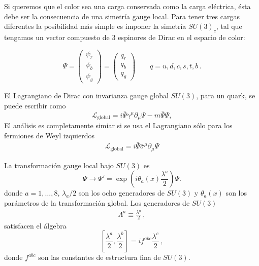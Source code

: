 \begin{frame}
Si queremos que el color sea una carga conservada como la carga eléctrica, ésta debe ser la consecuencia de una simetría gauge local. Para tener tres cargas diferentes la posibilidad más simple es imponer la simetría $SU(3)_c$, tal que tengamos un vector compuesto de 3 espinores de Dirac en el espacio de color:

  
\begin{equation}
  \Psi=
  \begin{pmatrix}
    \psi_r\\
    \psi_b\\
    \psi_g
  \end{pmatrix}
  =
  \begin{pmatrix}
    q_r\\
    q_b\\
    q_g
  \end{pmatrix}\qquad q=u,d,c,s,t,b\,.
\end{equation}
\end{frame}
El Lagrangiano de Dirac con invarianza gauge global $SU(3)$, para un quark, se puede escribir como
\begin{equation}
  \label{eq:128qft}
  \mathcal{L}_{\text{global}}=i\bar{\Psi}\gamma^\mu\partial_\mu\Psi-m\bar{\Psi}\Psi,
\end{equation}
El análisis es completamente simiar si se usa el Lagrangiano sólo para los fermiones de Weyl izquierdos
\begin{align}
    \mathcal{L}_{\text{global}}=i\bar{\Psi}\overline{\sigma}^\mu\partial_\mu\Psi
\end{align}

\begin{frame}
  
La transformación gauge local bajo $SU(3)$ es
\begin{equation}
  \Psi\to \Psi'=\exp\left(i\theta_a(x)\frac{\lambda^a}{2}\right)\Psi.
\end{equation}
donde $a=1,\ldots,8$, $\lambda_a/2$ son los ocho generadores de $SU(3)$ y $\theta_a(x)$ son los parámetros de la transformación global. Los generadores de $SU(3)$
\begin{align}
  \Lambda^a\equiv\frac{\lambda^a}{2}\,,
\end{align}
satisfacen el álgebra
\begin{equation}
  \left[\frac{\lambda^a}{2},\frac{\lambda^b}{2}\right]=if^{abc}\frac{\lambda^c}{2}\,,
\end{equation}
donde $f^{abc}$ son las constantes de estructura fina de $SU(3)$.
\end{frame}

